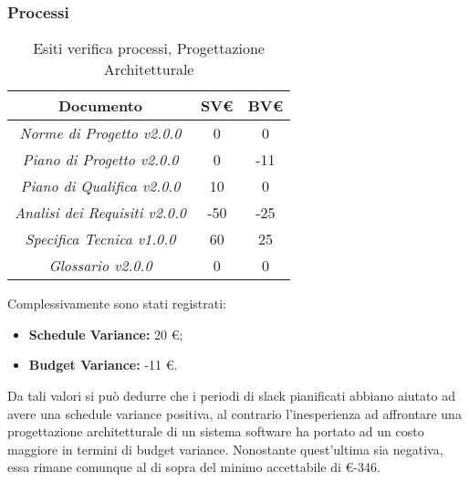\subsubsection{Processi}
\label{appendice 4}
\vspace{3mm}

\begin{table}[h]
	\begin{tabular}{|c|c|c|}
		\toprule
			\textbf{Documento} & \textbf{SV\euro} & \textbf{BV\euro} \\ 
		\midrule
		\midrule
			\textit{Norme di Progetto v2.0.0} & 0 & 0 \\  
			\textit{Piano di Progetto v2.0.0} & 0 & -11 \\ 
			\textit{Piano di Qualifica v2.0.0} & 10 & 0 \\ 
			\textit{Analisi dei Requisiti v2.0.0} & -50 & -25 \\
			\textit{Specifica Tecnica v1.0.0} & 60 & 25 \\ 
			\textit{Glossario v2.0.0} & 0 & 0 \\ 
		\bottomrule
	\end{tabular}
\caption{Esiti verifica processi, Progettazione Architetturale}
\end{table}

\noindent Complessivamente sono stati registrati:
\begin{itemize}
	\item \textbf{Schedule Variance:} 20 \euro;
	\item \textbf{Budget Variance:} -11 \euro.
\end{itemize}

\noindent Da tali valori si può dedurre che i periodi di slack pianificati abbiano aiutato ad avere una schedule variance positiva, al contrario l'inesperienza ad affrontare una progettazione architetturale di un sistema software ha portato ad un costo maggiore in termini di budget variance. Nonostante quest'ultima sia negativa, essa rimane comunque al di sopra del minimo accettabile di \euro -346.
